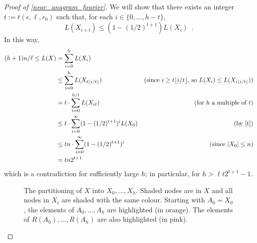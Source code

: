 \documentclass{patmorin}
\begin{document}
\begin{proof}[Proof of \cref{near_anagram_fourier}]
  We will show that there exists an integer $t:=t(\epsilon,\ell,r_0)$ such that, for each $i\in\{0,\ldots,h-t\}$,
  \begin{equation}
     L(X_{i+t}) \le (1-(1/2)^{t+1}) L(X_i) \enspace . \label{t}
  \end{equation}
  In this way,
  \begin{align*}
     (h+1)n/\ell
        \le L(X) & = \sum_{i=0}^{h} L(X_i) \\
           &\le \sum_{i=0}^{h} L(X_{t\floor{i/t}})
             & \text{(since $i\ge t\floor{i/t}$, so $L(X_i)\le L(X_{i\floor{i/t}}$))} \\
           & = t\cdot\sum_{i=0}^{h/t} L(X_{it})
             & \text{(for $h$ a multiple of $t$)} \\
           &\le t\cdot\sum_{i=0}^{\infty} (1-(1/2)^{t+1})^i L(X_0)
           & \text{(by \cref{t})}\\
           &\le tn\cdot \sum_{i=0}^{\infty} (1-(1/2)^{t+1})^i
           & \text{(since $|X_0|\le n$)} \\
           & = tn2^{t+1} \\
  \end{align*}
  which is a contradiction for sufficiently large $h$; in particular, for $h > \ell t2^{t+1}-1$.

  \begin{figure}
    \caption{The partitioning of $X$ into $X_0,\ldots,X_h$. Shaded
    nodes are in $X$ and all nodes in $X_i$ are shaded with the same
    colour.   Starting with $A_0=X_0$, the elements of $A_0,\ldots,A_h$
    are highlighted (in orange).  The elements of $R(A_0),\ldots,R(A_h)$ are also highlighted (in pink).}
    \label{bigtree}
  \end{figure}


\end{proof}
\end{document}

